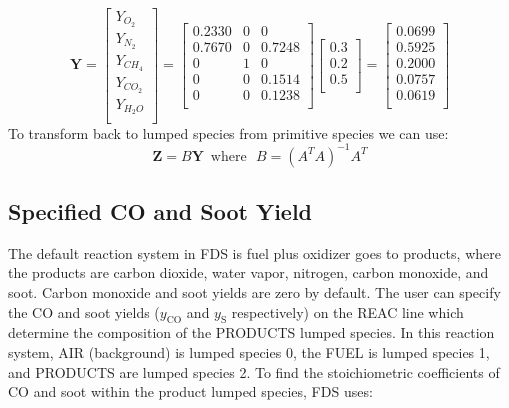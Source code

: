 \begin{displaymath}
\mathbf{Y}=\left[\begin{array}{c}
       Y_{O_2} \\
       Y_{N_2} \\
       Y_{CH_4} \\
       Y_{CO_2} \\
       Y_{H_2O} \\
     \end{array}\right]
     =\left[\begin{array}{ccc}
     0.2330 & 0 & 0 \\
     0.7670 & 0 & 0.7248 \\
     0 & 1 & 0 \\
     0 & 0 & 0.1514 \\
     0 & 0 & 0.1238 \\
     \end{array}\right]
     \left[\begin{array}{c}
     0.3 \\
     0.2 \\
     0.5 \\
     \end{array}\right]
     =\left[\begin{array}{c}
     0.0699\\
     0.5925\\
     0.2000\\
     0.0757\\
     0.0619\\
     \end{array}\right]
\end{displaymath}
To transform back to lumped species from primitive species we can use:
\begin{equation}\label{eq:transform_back}
\textbf{Z}=B\textbf{Y} \, \, \, \text{where} \, \, \, \, B=(A^TA)^{-1}A^T
\end{equation}

\subsection{Specified CO and Soot Yield}
The default reaction system in FDS is fuel plus oxidizer goes to products, where the products are carbon dioxide, water vapor, nitrogen, carbon monoxide, and soot. Carbon monoxide and soot yields are zero by default. The user can specify the CO and soot yields ($y_{\mathrm{CO}}$ and $y_{\mathrm{S}}$ respectively) on the {\ct REAC} line which determine the composition of the {\ct PRODUCTS} lumped species. In this reaction system, {\ct AIR} (background) is lumped species 0, the {\ct FUEL} is lumped species 1, and {\ct PRODUCTS} are lumped species 2. To find the stoichiometric coefficients of CO and soot within the product lumped species, FDS uses:  

